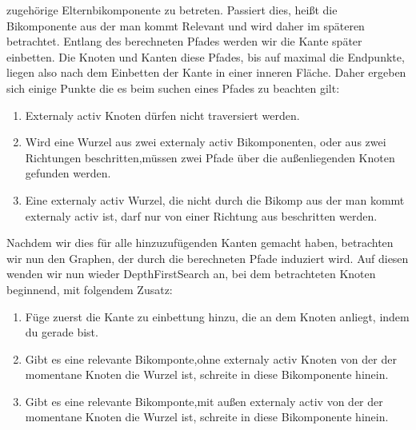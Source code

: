 \documentclass[runningheads]{llncs}
\begin{document}
    zugehörige Elternbikomponente zu betreten. Passiert dies, heißt die Bikomponente aus der man kommt Relevant und wird daher im späteren betrachtet. Entlang des berechneten Pfades werden wir die Kante später einbetten. Die Knoten und Kanten diese Pfades, bis auf maximal die Endpunkte, liegen also nach dem Einbetten der Kante in einer inneren Fläche.
    Daher ergeben sich einige Punkte die es beim suchen eines Pfades zu beachten gilt:
    \begin{enumerate}
        \item Externaly activ Knoten dürfen nicht traversiert werden.
        \item Wird eine Wurzel aus zwei externaly activ Bikomponenten, oder aus zwei Richtungen beschritten,müssen zwei Pfade über die außenliegenden Knoten gefunden werden.
        \item Eine externaly activ Wurzel, die nicht durch die Bikomp aus der man kommt externaly activ ist, darf nur von einer Richtung aus beschritten werden.
    \end{enumerate}

    Nachdem wir dies für alle hinzuzufügenden Kanten gemacht haben, betrachten wir nun den Graphen, der durch die berechneten Pfade induziert wird. Auf diesen wenden wir nun wieder DepthFirstSearch an, bei dem betrachteten Knoten beginnend, mit folgendem Zusatz:
    \begin{enumerate}
        \item Füge zuerst die Kante zu einbettung hinzu, die an dem Knoten anliegt, indem du gerade bist.
        \item Gibt es eine relevante Bikomponte,ohne externaly activ Knoten von der der momentane Knoten die Wurzel ist, schreite in diese Bikomponente hinein.
        \item Gibt es eine relevante Bikomponte,mit außen externaly activ von der der momentane Knoten die Wurzel ist, schreite in diese Bikomponente hinein.

    \end{enumerate}
\end{document}
